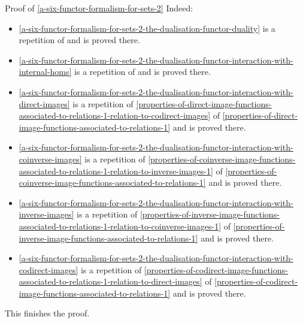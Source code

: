 \begin{Proof}{Proof of \cref{a-six-functor-formalism-for-sets-2}}
    Indeed:
    \begin{itemize}
        \item \cref{a-six-functor-formalism-for-sets-2-the-dualisation-functor-duality} is a repetition of  and is proved there.
        \item \cref{a-six-functor-formalism-for-sets-2-the-dualisation-functor-interaction-with-internal-homs} is a repetition of  and is proved there.
        \item \cref{a-six-functor-formalism-for-sets-2-the-dualisation-functor-interaction-with-direct-images} is a repetition of \cref{properties-of-direct-image-functions-associated-to-relations-1-relation-to-codirect-images} of \cref{properties-of-direct-image-functions-associated-to-relations-1} and is proved there.
        \item \cref{a-six-functor-formalism-for-sets-2-the-dualisation-functor-interaction-with-coinverse-images} is a repetition of \cref{properties-of-coinverse-image-functions-associated-to-relations-1-relation-to-inverse-images-1} of \cref{properties-of-coinverse-image-functions-associated-to-relations-1} and is proved there.
        \item \cref{a-six-functor-formalism-for-sets-2-the-dualisation-functor-interaction-with-inverse-images} is a repetition of \cref{properties-of-inverse-image-functions-associated-to-relations-1-relation-to-coinverse-images-1} of \cref{properties-of-inverse-image-functions-associated-to-relations-1} and is proved there.
        \item \cref{a-six-functor-formalism-for-sets-2-the-dualisation-functor-interaction-with-codirect-images} is a repetition of \cref{properties-of-codirect-image-functions-associated-to-relations-1-relation-to-direct-images} of \cref{properties-of-codirect-image-functions-associated-to-relations-1} and is proved there.
    \end{itemize}
    This finishes the proof.
\end{Proof}
